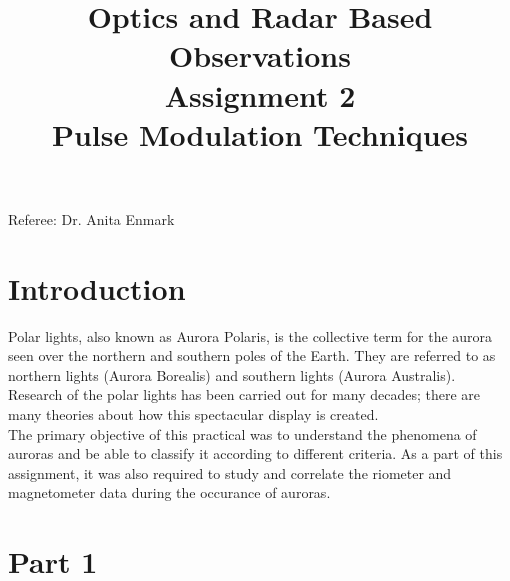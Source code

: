 \documentclass{article}
\title{\textbf {Optics and Radar Based Observations} \\ Assignment 2\\ Pulse Modulation Techniques} %
\author{\authors}
\begin{document}
\maketitle %

\centerline{Referee: Dr. Anita Enmark}


\setlength\parindent{0pt} %

\renewcommand{\labelenumi}{\alph{enumi}.} %
\clearpage

\tableofcontents

\listoffigures

\clearpage


\section{Introduction}
Polar lights, also known as Aurora Polaris, is the collective term for the aurora seen over the northern and southern poles of the Earth. They are referred to as northern lights (Aurora Borealis) and southern lights (Aurora Australis). Research of the polar lights has been carried out for many decades; there are many theories about how this spectacular display is created. \cite{Stenberg:2012ab}\\ 
The primary objective of this practical was to understand the phenomena of auroras and be able to classify it according to different criteria. As a part of this assignment, it was also required to study and correlate the riometer and magnetometer data during the occurance of auroras.
 

\section{Part 1}
\end{document}
